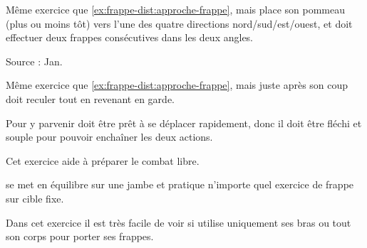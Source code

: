 \begin{exercice}

Même exercice que \ref{ex:frappe-dist:approche-frappe}, mais \D place son pommeau (plus ou moins tôt) vers l'une des quatre directions nord/sud/est/ouest, et \A doit effectuer deux frappes consécutives dans les deux angles.

Source : Jan.
\end{exercice}


\begin{exercice}

Même exercice que \ref{ex:frappe-dist:approche-frappe}, mais juste après son coup \A doit reculer tout en revenant en garde.

Pour y parvenir \A doit être prêt à se déplacer rapidement, donc il doit être fléchi et souple pour pouvoir enchaîner les deux actions.

Cet exercice aide à préparer le combat libre.

\end{exercice}


\begin{exercice}
\A se met en équilibre sur une jambe et pratique n'importe quel exercice de frappe sur cible fixe.

Dans cet exercice il est très facile de voir si \A utilise uniquement ses bras ou tout son corps pour porter ses frappes.
\end{exercice}
